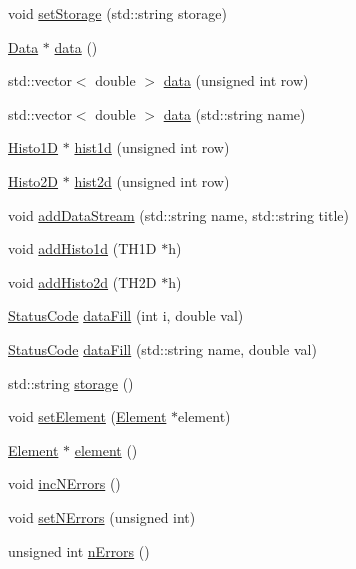 \begin{DoxyCompactItemize}
\item 
void \hyperlink{classProcessus_ad57a29b33f9021eda9f6929136f1784f}{setStorage} (std::string storage)
\item 
\hyperlink{classData}{Data} $\ast$ \hyperlink{classProcessus_a16e45f329fbce935aeef0ff3cb508228}{data} ()
\item 
std::vector$<$ double $>$ \hyperlink{classProcessus_aa7c57483cf4b9ab0b2d0ae2de8316402}{data} (unsigned int row)
\item 
std::vector$<$ double $>$ \hyperlink{classProcessus_abf4d91fb36707e1d50178bab12d21ae9}{data} (std::string name)
\item 
\hyperlink{classHisto1D}{Histo1D} $\ast$ \hyperlink{classProcessus_a409227db936baff03c0462c1bcfe8069}{hist1d} (unsigned int row)
\item 
\hyperlink{classHisto2D}{Histo2D} $\ast$ \hyperlink{classProcessus_a73b5118cb5f2b5eaad33286183b86cfc}{hist2d} (unsigned int row)
\item 
void \hyperlink{classProcessus_a308c8f193802f1d1ab49d4447d0cb281}{addDataStream} (std::string name, std::string title)
\item 
void \hyperlink{classProcessus_ad46e0d4dfdfdcbce001ee6be1746dfa4}{addHisto1d} (TH1D $\ast$h)
\item 
void \hyperlink{classProcessus_ac1ed1aed5edaeabdf18aa56775440471}{addHisto2d} (TH2D $\ast$h)
\item 
\hyperlink{classStatusCode}{StatusCode} \hyperlink{classProcessus_a0d093b48f3218a088ba030e24372f18c}{dataFill} (int i, double val)
\item 
\hyperlink{classStatusCode}{StatusCode} \hyperlink{classProcessus_aa31ab71711f7af6a729441ff573f69c9}{dataFill} (std::string name, double val)
\item 
std::string \hyperlink{classProcessus_a33fa1a0b54a636e5cdd680669fd9ea51}{storage} ()
\item 
void \hyperlink{classProcessus_a8ddef94227d83d9dae2cd49aebc33353}{setElement} (\hyperlink{classElement}{Element} $\ast$element)
\item 
\hyperlink{classElement}{Element} $\ast$ \hyperlink{classProcessus_a6fe155527431a7190b7d44d600b9608d}{element} ()
\item 
void \hyperlink{classProcessus_abe603d0636f76db6aa6c5c60cf34c591}{incNErrors} ()
\item 
void \hyperlink{classProcessus_a831b027b9cf18ab56fa6147b5d3055da}{setNErrors} (unsigned int)
\item 
unsigned int \hyperlink{classProcessus_a82a0487f82f07cc2c2dc2731f98149e7}{nErrors} ()

\end{DoxyCompactItemize}
